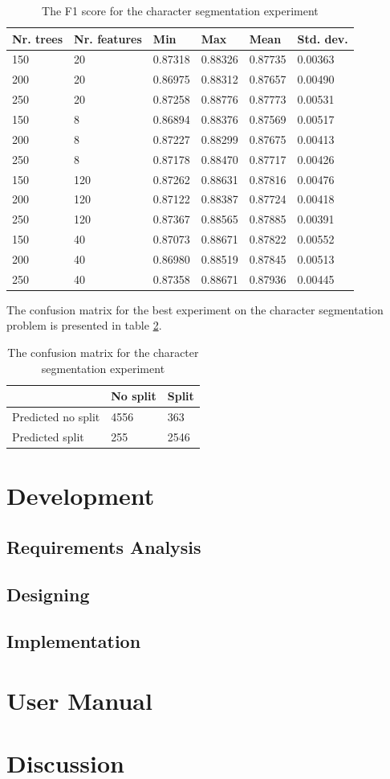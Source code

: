 \begin{table}[h]
\caption{The F1 score for the character segmentation experiment}
\label{table:seg_values}
\begin{tabular}{llllll}
\hline
Nr. trees & Nr. features & Min     & Max     & Mean    & Std. dev. \\ \hline
150 & 20 & 0.87318 & 0.88326 & 0.87735 & 0.00363 \\ 
200 & 20 & 0.86975 & 0.88312 & 0.87657 & 0.00490 \\ 
250 & 20 & 0.87258 & 0.88776 & 0.87773 & 0.00531 \\ 
150 & 8 & 0.86894 & 0.88376 & 0.87569 & 0.00517 \\ 
200 & 8 & 0.87227 & 0.88299 & 0.87675 & 0.00413 \\ 
250 & 8 & 0.87178 & 0.88470 & 0.87717 & 0.00426 \\ 
150 & 120 & 0.87262 & 0.88631 & 0.87816 & 0.00476 \\ 
200 & 120 & 0.87122 & 0.88387 & 0.87724 & 0.00418 \\ 
250 & 120 & 0.87367 & 0.88565 & 0.87885 & 0.00391 \\ 
150 & 40 & 0.87073 & 0.88671 & 0.87822 & 0.00552 \\ 
200 & 40 & 0.86980 & 0.88519 & 0.87845 & 0.00513 \\ 
250 & 40 & 0.87358 & 0.88671 & 0.87936 & 0.00445 \\  \hline
\end{tabular}
\end{table}

The confusion matrix for the best experiment on the character segmentation problem is presented in table \ref{table:seg_conf}.

\begin{table}[h]
\caption{The confusion matrix for the character segmentation experiment}
\label{table:seg_conf}
\begin{tabular}{lll}
\hline
 & No split & Split \\ \hline
Predicted no split & 4556 & 363 \\ 
Predicted split & 255 & 2546 \\  \hline
\end{tabular}
\end{table}
\section{Development}
\subsection{Requirements Analysis}
\subsection{Designing}
\subsection{Implementation}
\section{User Manual}
\label{sec:manual}
\section{Discussion}